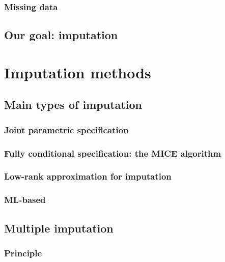 \documentclass[12pt, a4paper]{memoir}
\begin{document}
		\subsection{Missing data}
	\section{Our goal: imputation}

\chapter{Imputation methods}
\label{imputation}
	\section{Main types of imputation}
		\subsection{Joint parametric specification}
		\subsection{Fully conditional specification: the MICE algorithm}
		\subsection{Low-rank approximation for imputation}
		\subsection{ML-based}
	\section{Multiple imputation}
		\subsection{Principle}
\end{document}
